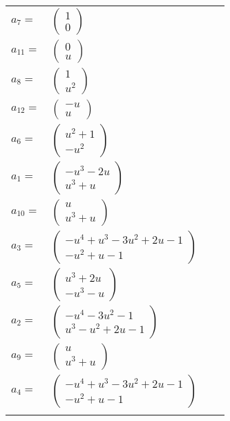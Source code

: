 \documentclass[1p]{elsarticle_modified}
\theoremstyle{definition}
\begin{document}
\begin{tabular}{m{7pt} m{180pt} m{7pt} m{180pt} }
\flushright $a_{7}=$&$\begin{pmatrix}1\\0\end{pmatrix}$ \\
\flushright $a_{11}=$&$\begin{pmatrix}0\\u\end{pmatrix}$ \\
\flushright $a_{8}=$&$\begin{pmatrix}1\\u^2\end{pmatrix}$ \\
\flushright $a_{12}=$&$\begin{pmatrix}- u\\u\end{pmatrix}$ \\
\flushright $a_{6}=$&$\begin{pmatrix}u^2+1\\- u^2\end{pmatrix}$ \\
\flushright $a_{1}=$&$\begin{pmatrix}- u^3-2 u\\u^3+u\end{pmatrix}$ \\
\flushright $a_{10}=$&$\begin{pmatrix}u\\u^3+u\end{pmatrix}$ \\
\flushright $a_{3}=$&$\begin{pmatrix}- u^4+u^3-3 u^2+2 u-1\\- u^2+u-1\end{pmatrix}$ \\
\flushright $a_{5}=$&$\begin{pmatrix}u^3+2 u\\- u^3- u\end{pmatrix}$ \\
\flushright $a_{2}=$&$\begin{pmatrix}- u^4-3 u^2-1\\u^3- u^2+2 u-1\end{pmatrix}$ \\
\flushright $a_{9}=$&$\begin{pmatrix}u\\u^3+u\end{pmatrix}$ \\
\flushright $a_{4}=$&$\begin{pmatrix}- u^4+u^3-3 u^2+2 u-1\\- u^2+u-1\end{pmatrix}$\\&\end{tabular}
\end{document}
